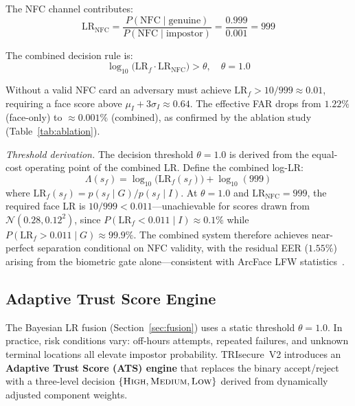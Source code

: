 \documentclass[pdflatex,sn-mathphys-num]{sn-jnl}%
\theoremstyle{thmstyleone}%
\theoremstyle{thmstyletwo}%
\theoremstyle{thmstylethree}%
\begin{document}
The NFC channel contributes:
\begin{equation}
  \mathrm{LR}_{\mathrm{NFC}} =
  \frac{P(\mathrm{NFC}\mid\text{genuine})}{P(\mathrm{NFC}\mid\text{impostor})}
  = \frac{0.999}{0.001} = 999
\end{equation}

The combined decision rule is:
\begin{equation}
  \log_{10}\!\bigl(\mathrm{LR}_f \cdot \mathrm{LR}_{\mathrm{NFC}}\bigr) >
  \theta, \quad \theta = 1.0
\end{equation}

Without a valid NFC card an adversary must achieve
\(\mathrm{LR}_f > 10/999 \approx 0.01\), requiring a face score above
\(\mu_I + 3\sigma_I \approx 0.64\). The effective FAR drops from
\(1.22\%\) (face-only) to \(\approx 0.001\%\) (combined), as confirmed by
the ablation study (Table~\ref{tab:ablation}).

\textit{Threshold derivation.} The decision threshold \(\theta=1.0\) is
derived from the equal-cost operating point of the combined LR. Define the
combined log-LR:
\begin{equation}
  \Lambda(s_f) = \log_{10}\!\bigl(\mathrm{LR}_f(s_f)\bigr)
               + \log_{10}(999)
\end{equation}
where \(\mathrm{LR}_f(s_f) = p(s_f\mid G)/p(s_f\mid I)\). At
\(\theta{=}1.0\) and \(\mathrm{LR}_{\mathrm{NFC}}{=}999\), the required face
LR is \(10/999 < 0.011\)---unachievable for scores drawn from
\(\mathcal{N}(0.28, 0.12^2)\), since \(P(\mathrm{LR}_f < 0.011 \mid I)
\approx 0.1\%\) while \(P(\mathrm{LR}_f > 0.011 \mid G) \approx 99.9\%\).
The combined system therefore achieves near-perfect separation conditional on
NFC validity, with the residual EER (\(1.55\%\)) arising from the biometric
gate alone---consistent with ArcFace LFW statistics~\cite{deng2019arcface}.

\subsection{Adaptive Trust Score Engine}\label{sec:ats}

The Bayesian LR fusion (Section~\ref{sec:fusion}) uses a static threshold
\(\theta=1.0\). In practice, risk conditions vary: off-hours attempts, repeated
failures, and unknown terminal locations all elevate impostor probability.
TRIsecure~V2 introduces an \textbf{Adaptive Trust Score (ATS) engine} that
replaces the binary accept/reject with a three-level decision
\(\{\textsc{High}, \textsc{Medium}, \textsc{Low}\}\) derived from dynamically
adjusted component weights.
\end{document}
